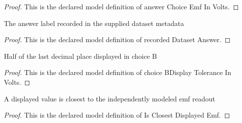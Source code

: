 \begin{proof}
  This is the declared model definition of answer Choice Emf In Volts.
\end{proof}
\begin{definition}
  \label{def:physics:phyx-mini-0933:phyxminiproblems-problemphyxmini0933-recordeddatasetanswer}
  The answer label recorded in the supplied dataset metadata
\end{definition}
\begin{proof}
  This is the declared model definition of recorded Dataset Answer.
\end{proof}
\begin{definition}
  \label{def:physics:phyx-mini-0933:phyxminiproblems-problemphyxmini0933-choicebdisplaytoleranceinvolts}
  Half of the last decimal place displayed in choice B
\end{definition}
\begin{proof}
  This is the declared model definition of choice BDisplay Tolerance In Volts.
\end{proof}
\begin{definition}
  \label{def:physics:phyx-mini-0933:phyxminiproblems-problemphyxmini0933-isclosestdisplayedemf}
  A displayed value is closest to the independently modeled emf readout
\end{definition}
\begin{proof}
  This is the declared model definition of Is Closest Displayed Emf.
\end{proof}

